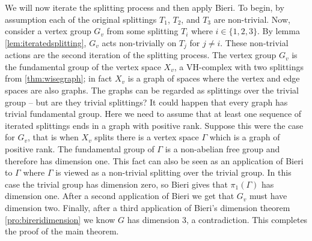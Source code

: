 \documentclass[12pt,parskip=full]{report}
\theoremstyle{plain}
\theoremstyle{definition}
\begin{document}
We will now iterate the splitting process and then apply Bieri. To begin, by assumption each of the original splittings \(T_1\), \(T_2\), and \(T_3\) are non-trivial. Now, consider a vertex group \(G_v\) from some splitting \(T_i\) where \(i\in \{1,2,3\}\). By lemma \ref{lem:iteratedsplitting}, \(G_v\) acts non-trivially on \(T_j\) for \(j\neq i\). These non-trivial actions are the second iteration of the splitting process. The vertex group \(G_v\) is the fundamental group of  the vertex space \(X_v\), a VH-complex with two splittings from \ref{thm:wisegraph}; in fact \(X_v\) is a graph of spaces where the vertex and edge spaces are also graphs. The graphs can be regarded as splittings over the trivial group -- but are they trivial splittings? It could happen that every graph has trivial fundamental group. Here we need to assume that at least one sequence of iterated splittings ends in a graph with positive rank. Suppose this were the case for \(G_v\), that is when \(X_v\) splits there is a vertex space \(\Gamma\) which is a graph of positive rank. The fundamental group of \(\Gamma\) is a non-abelian free group and therefore has dimension one. This fact can also be seen as an application of Bieri to \(\Gamma\) where \(\Gamma\) is viewed as a non-trivial splitting over the trivial group. In this case the trivial group has dimension zero, so Bieri gives that \(\pi_1(\Gamma)\) has dimension one. After a second application of Bieri we get that \(G_v\) must have dimension two. Finally, after a third application of Bieri's dimension theorem \ref{pro:bireridimension} we know \(G\) has dimension 3, a contradiction. This completes the proof of the main theorem.



\noindent

\cleardoublepage






\end{document}
